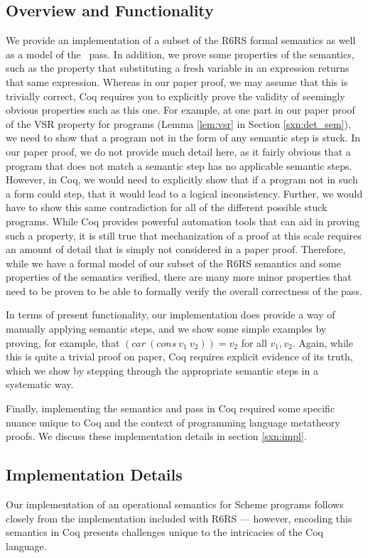 \subsection{Overview and Functionality}
We provide an implementation of a subset of the R6RS formal semantics as well as a model of the \caname\ pass. In addition, we prove some properties of the semantics, such as the property that substituting a fresh variable in an expression returns that same expression. Whereas in our paper proof, we may assume that this is trivially correct, Coq requires you to explicitly prove the validity of seemingly obvious properties such as this one. For example, at one part in our paper proof of the VSR property for programs (Lemma \ref{lem:vsr} in Section \ref{sxn:det_sem}), we need to show that a program not in the form of any semantic step is stuck. In our paper proof, we do not provide much detail here, as it fairly obvious that a program that does not match a semantic step has no applicable semantic steps. However, in Coq, we would need to explicitly show that if a program not in such a form could step, that it would lead to a logical inconsistency. Further, we would have to show this same contradiction for all of the different possible stuck programs. While Coq provides powerful automation tools that can aid in proving such a property, it is still true that mechanization of a proof at this scale requires an amount of detail that is simply not considered in a paper proof. Therefore, while we have a formal model of our subset of the R6RS semantics and some properties of the semantics verified, there are many more minor properties that need to be proven to be able to formally verify the overall correctness of the pass.

In terms of present functionality, our implementation does provide a way of manually applying semantic steps, and we show some simple examples by proving, for example, that $(car\ (cons\ v_1\ v_2)) = v_2$ for all $v_1, v_2$. Again, while this is quite a trivial proof on paper, Coq requires explicit evidence of its truth, which we show by stepping through the appropriate semantic steps in a systematic way.

Finally, implementing the semantics and pass in Coq required some specific nuance unique to Coq and the context of programming language metatheory proofs. We discuss these implementation details in section \ref{sxn:impl}.
\subsection{Implementation Details\label{sxn:impl}}
Our implementation of an operational semantics for Scheme programs follows closely from the implementation included with R6RS --- however, encoding this semantics in Coq presents challenges unique to the intricacies of the Coq language.
